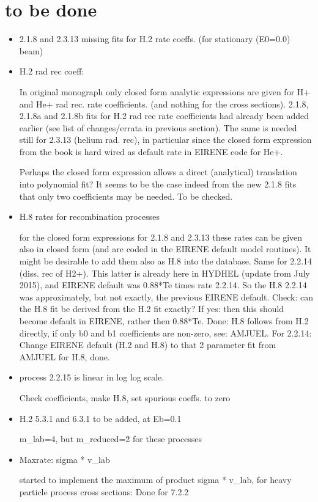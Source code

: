 \documentclass[12pt,dvipdfm]{article}
\begin{document}
\section*{to be done}
\begin{itemize}
\item {2.1.8  and 2.3.13 missing fits for H.2 rate coeffs. (for stationary (E0=0.0) beam)}

\item {H.2 rad rec coeff:}

In original monograph only closed form analytic expressions are given for H+ and He+ rad rec. rate coefficients.
(and nothing for the cross sections).
2.1.8, 2.1.8a and 2.1.8b fits for H.2 rad rec rate coefficients had already been added earlier (see list of changes/errata in previous section).
The same is needed still for
2.3.13 (helium rad. rec), in particular since the closed form expression from the book is hard wired as default rate in EIRENE code for He+.

Perhaps the closed form expression allows a direct (analytical) translation into polynomial fit? It seems to be the case indeed from
the new 2.1.8 fits that only two coefficients may be needed. To be checked.

\item {H.8 rates for recombination processes}

for the closed form expressions for 2.1.8 and 2.3.13 these rates can be given also in closed form (and are coded in
the EIRENE default model routines). It might be desirable to add them also as H.8 into the database. Same
for 2.2.14 (diss. rec of H2+). This latter is already here in HYDHEL (update from July 2015), and EIRENE default was 0.88*Te times rate 2.2.14.
So the H.8  2.2.14 was approximately, but not exactly, the previous EIRENE default.
Check: can the H.8 fit be derived from the H.2 fit exactly? If yes: then this should become default in EIRENE, rather then 0.88*Te.
Done:  H.8 follows from H.2 directly, if only b0 and b1 coefficients are non-zero, see: AMJUEL.
For 2.2.14: Change EIRENE default (H.2 and H.8) to that 2 parameter fit
from AMJUEL for H.8, done.

\item{process 2.2.15 is linear in log log scale. }

Check coefficients, make H.8, set spurious coeffs. to zero
\item{H.2  5.3.1 and 6.3.1 to be added, at Eb=0.1}

m\_lab=4,  but m\_reduced=2 for these processes
\item {Maxrate: sigma * v\_lab }

started to implement the maximum of product sigma * v\_lab, for heavy particle process cross sections:
Done for 7.2.2

\end{itemize}
\newpage
\end{document}

